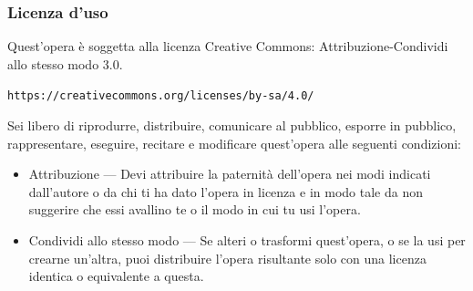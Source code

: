 \begin{frame}[containsverbatim]\frametitle{Licenza d'uso}
  \small

  Quest'opera {\`e} soggetta alla licenza Creative Commons: Attribuzione-Condividi
  allo stesso modo 3.0.

  \verb+https://creativecommons.org/licenses/by-sa/4.0/+

  Sei libero di riprodurre, distribuire, comunicare al pubblico, esporre in
  pubblico, rappresentare, eseguire, recitare e modificare quest'opera
  alle seguenti condizioni:
  \begin{itemize}
  \item
    Attribuzione — Devi attribuire la paternit{\`a} dell'opera nei modi indicati
    dall'autore o da chi ti ha dato l'opera in licenza e in modo tale da non
    suggerire che essi avallino te o il modo in cui tu usi l'opera.
  \item
    Condividi allo stesso modo — Se alteri o trasformi quest'opera, o se la usi
    per crearne un'altra, puoi distribuire l'opera risultante solo con una licenza
    identica o equivalente a  questa.
  \end{itemize}
  \vspace*{1cm}
\end{frame}






